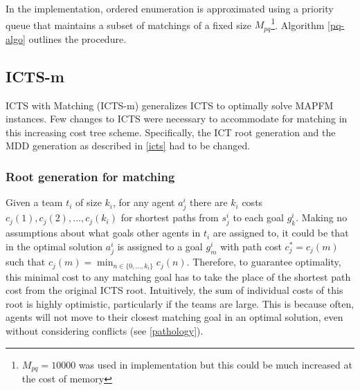 \documentclass[english,10pt]{article}
\begin{document}
	In the implementation, ordered enumeration is approximated using a priority queue that maintains a subset of matchings of a fixed size $M_{pq}$\footnote{$M_{pq} = 10000$ was used in implementation but this could be much increased at the cost of memory}. Algorithm \ref{pq-algo} outlines the procedure.
	
	\subsection{ICTS-m}
	ICTS with Matching (ICTS-m) generalizes ICTS to optimally solve MAPFM instances. Few changes to ICTS were necessary to accommodate for matching in this increasing cost tree scheme. Specifically, the ICT root generation and the MDD generation as described in \ref{icts} had to be changed.
	\subsubsection{Root generation for matching}
	Given a team $t_i$ of size $k_i$, for any agent $a_j^i$ there are $k_i$ costs $c_j(1),c_j(2),\ldots,c_j(k_i)$ for shortest paths from $s_j^i$ to each goal $g_k^i$. Making no assumptions about what goals other agents in $t_i$ are assigned to, it could be that in the optimal solution $a_j^i$ is assigned to a goal $g_{m}^i$ with path cost $c^*_j = c_j(m)$ such that $c_j(m) = \min_{n\in\{0,\ldots,k_i\}} c_j(n)$. Therefore, to guarantee optimality, this minimal cost to any matching goal has to take the place of the shortest path cost from the original ICTS root. Intuitively, the sum of individual costs of this root is highly optimistic, particularly if the teams are large. This is because often, agents will not move to their closest matching goal in an optimal solution, even without considering conflicts (see \ref{pathology}).
	
\end{document}
